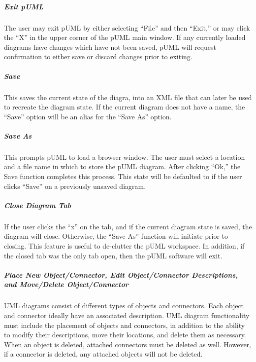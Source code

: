 \documentclass[twoside,letterpaper]{article}
\begin{document}
\subparagraph{Exit pUML}
{ The user may exit pUML by either selecting ``File'' and then ``Exit,'' or may click the ``X'' in the upper corner of the pUML main window. If any currently loaded diagrams have changes which have not been saved, pUML will request confirmation to either save or discard changes prior to exiting. }

\subparagraph{Save}
{ This saves the current state of the diagra, into an XML file that can later be used to recreate the diagram state. If the current diagram does not have a name, the ``Save'' option will be an alias for the ``Save As'' option.}

\subparagraph{Save As}
{ This prompts pUML to load a browser window. The user must select a location and a file name in which to store the pUML diagram.  After clicking ``Ok,'' the Save function completes this process.  This state will be defaulted to if the user clicks ``Save'' on a previously unsaved diagram.}

\subparagraph{Close Diagram Tab}
{ If the user clicks the ``x'' on the tab, and if the current diagram state is saved, the diagram will close. Otherwise, the ``Save As'' function will initiate prior to closing. This feature is useful to de-clutter the pUML workspace. In addition, if the closed tab was the only tab open, then the pUML software will exit.}

\subparagraph{Place New Object/Connector, Edit Object/Connector Descriptions, and Move/Delete Object/Connector}
{ UML diagrams consist of different types of objects and connectors. Each object and connector ideally have an associated description. UML diagram functionality must include the placement of objects and connectors, in addition to the ability to modify their descriptions, move their locations, and delete them as necessary. When an object is deleted, attached connectors must be deleted as well. However, if a connector is deleted, any attached objects will not be deleted. }




\clearpage
\end{document}
